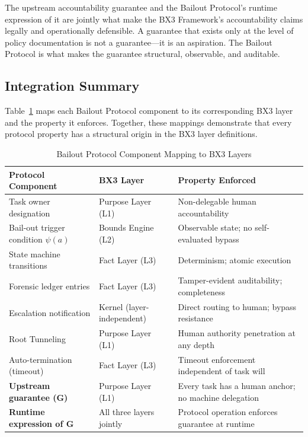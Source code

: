 The upstream accountability guarantee and the Bailout Protocol's runtime expression of it are jointly what make the BX3 Framework's accountability claims legally and operationally defensible. A guarantee that exists only at the level of policy documentation is not a guarantee---it is an aspiration. The Bailout Protocol is what makes the guarantee structural, observable, and auditable.

\subsection{Integration Summary}
\label{sec:integration-summary}

Table~\ref{tab:bailout-layer-mapping} maps each Bailout Protocol component to its corresponding BX3 layer and the property it enforces. Together, these mappings demonstrate that every protocol property has a structural origin in the BX3 layer definitions.

\begin{table}[htbp]
\centering
\caption{Bailout Protocol Component Mapping to BX3 Layers}
\label{tab:bailout-layer-mapping}
\begin{tabular}{@{}lll@{}}
\toprule
\textbf{Protocol Component} & \textbf{BX3 Layer} & \textbf{Property Enforced} \\
\midrule
Task owner designation & Purpose Layer (L1) & Non-delegable human accountability \\
Bail-out trigger condition $\psi(a)$ & Bounds Engine (L2) & Observable state; no self-evaluated bypass \\
State machine transitions & Fact Layer (L3) & Determinism; atomic execution \\
Forensic ledger entries & Fact Layer (L3) & Tamper-evident auditability; completeness \\
Escalation notification & Kernel (layer-independent) & Direct routing to human; bypass resistance \\
Root Tunneling & Purpose Layer (L1) & Human authority penetration at any depth \\
Auto-termination (timeout) & Fact Layer (L3) & Timeout enforcement independent of task will \\
\midrule
\textbf{Upstream guarantee (G)} & Purpose Layer (L1) & Every task has a human anchor; no machine delegation \\
\textbf{Runtime expression of G} & All three layers jointly & Protocol operation enforces guarantee at runtime \\
\bottomrule
\end{tabular}
\end{table}

